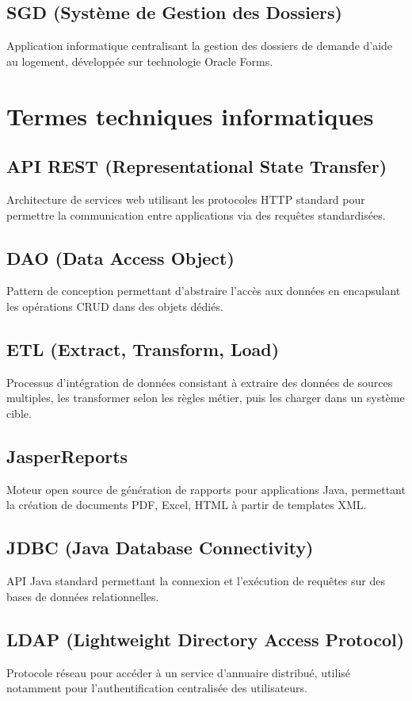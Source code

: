 \subsection{SGD (Système de Gestion des Dossiers)}
Application informatique centralisant la gestion des dossiers de demande d'aide au logement, développée sur technologie Oracle Forms.

\section{Termes techniques informatiques}

\subsection{API REST (Representational State Transfer)}
Architecture de services web utilisant les protocoles HTTP standard pour permettre la communication entre applications via des requêtes standardisées.

\subsection{DAO (Data Access Object)}
Pattern de conception permettant d'abstraire l'accès aux données en encapsulant les opérations CRUD dans des objets dédiés.

\subsection{ETL (Extract, Transform, Load)}
Processus d'intégration de données consistant à extraire des données de sources multiples, les transformer selon les règles métier, puis les charger dans un système cible.

\subsection{JasperReports}
Moteur open source de génération de rapports pour applications Java, permettant la création de documents PDF, Excel, HTML à partir de templates XML.

\subsection{JDBC (Java Database Connectivity)}
API Java standard permettant la connexion et l'exécution de requêtes sur des bases de données relationnelles.

\subsection{LDAP (Lightweight Directory Access Protocol)}
Protocole réseau pour accéder à un service d'annuaire distribué, utilisé notamment pour l'authentification centralisée des utilisateurs.

